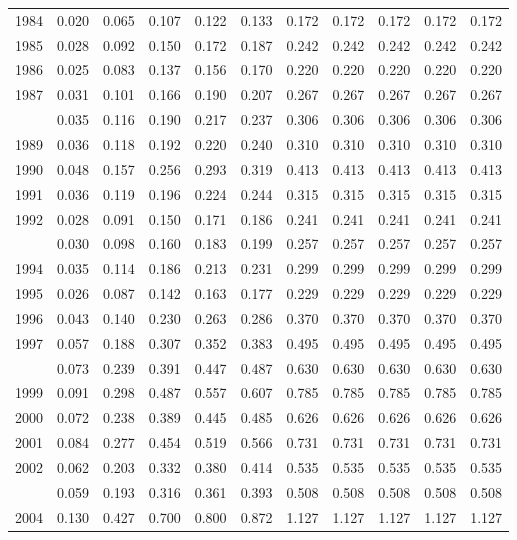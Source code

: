 \documentclass[
]{article}
\begin{document}
\begin{longtable}[t]{lrrrrrrrrrr}
1984 & 0.020 & 0.065 & 0.107 & 0.122 & 0.133 & 0.172 & 0.172 & 0.172 & 0.172 & 0.172\\
1985 & 0.028 & 0.092 & 0.150 & 0.172 & 0.187 & 0.242 & 0.242 & 0.242 & 0.242 & 0.242\\
1986 & 0.025 & 0.083 & 0.137 & 0.156 & 0.170 & 0.220 & 0.220 & 0.220 & 0.220 & 0.220\\
1987 & 0.031 & 0.101 & 0.166 & 0.190 & 0.207 & 0.267 & 0.267 & 0.267 & 0.267 & 0.267\\
\addlinespace
1988 & 0.035 & 0.116 & 0.190 & 0.217 & 0.237 & 0.306 & 0.306 & 0.306 & 0.306 & 0.306\\
1989 & 0.036 & 0.118 & 0.192 & 0.220 & 0.240 & 0.310 & 0.310 & 0.310 & 0.310 & 0.310\\
1990 & 0.048 & 0.157 & 0.256 & 0.293 & 0.319 & 0.413 & 0.413 & 0.413 & 0.413 & 0.413\\
1991 & 0.036 & 0.119 & 0.196 & 0.224 & 0.244 & 0.315 & 0.315 & 0.315 & 0.315 & 0.315\\
1992 & 0.028 & 0.091 & 0.150 & 0.171 & 0.186 & 0.241 & 0.241 & 0.241 & 0.241 & 0.241\\
\addlinespace
1993 & 0.030 & 0.098 & 0.160 & 0.183 & 0.199 & 0.257 & 0.257 & 0.257 & 0.257 & 0.257\\
1994 & 0.035 & 0.114 & 0.186 & 0.213 & 0.231 & 0.299 & 0.299 & 0.299 & 0.299 & 0.299\\
1995 & 0.026 & 0.087 & 0.142 & 0.163 & 0.177 & 0.229 & 0.229 & 0.229 & 0.229 & 0.229\\
1996 & 0.043 & 0.140 & 0.230 & 0.263 & 0.286 & 0.370 & 0.370 & 0.370 & 0.370 & 0.370\\
1997 & 0.057 & 0.188 & 0.307 & 0.352 & 0.383 & 0.495 & 0.495 & 0.495 & 0.495 & 0.495\\
\addlinespace
1998 & 0.073 & 0.239 & 0.391 & 0.447 & 0.487 & 0.630 & 0.630 & 0.630 & 0.630 & 0.630\\
1999 & 0.091 & 0.298 & 0.487 & 0.557 & 0.607 & 0.785 & 0.785 & 0.785 & 0.785 & 0.785\\
2000 & 0.072 & 0.238 & 0.389 & 0.445 & 0.485 & 0.626 & 0.626 & 0.626 & 0.626 & 0.626\\
2001 & 0.084 & 0.277 & 0.454 & 0.519 & 0.566 & 0.731 & 0.731 & 0.731 & 0.731 & 0.731\\
2002 & 0.062 & 0.203 & 0.332 & 0.380 & 0.414 & 0.535 & 0.535 & 0.535 & 0.535 & 0.535\\
\addlinespace
2003 & 0.059 & 0.193 & 0.316 & 0.361 & 0.393 & 0.508 & 0.508 & 0.508 & 0.508 & 0.508\\
2004 & 0.130 & 0.427 & 0.700 & 0.800 & 0.872 & 1.127 & 1.127 & 1.127 & 1.127 & 1.127\\

\end{longtable}
\end{document}

